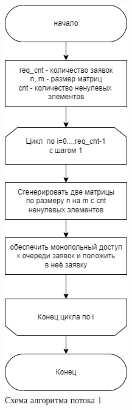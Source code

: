 \begin{figure}[h]
	\centering
	\includegraphics[height=0.7\textheight]{img/gen.png}
	\caption{Схема алгоритма потока 1}
	\label{fig:gen}
\end{figure}

